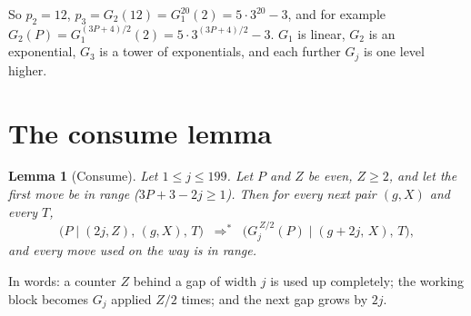 \documentclass[11pt]{article}
\newtheorem{lemma}{Lemma}
\theoremstyle{definition}
\theoremstyle{remark}
\newcommand{\st}[2]{\bigl(#1 \mid #2\bigr)}
\newcommand{\too}{\;\Longrightarrow^{*}\;}
\begin{document}
So $p_2=12$, $p_3=G_2(12)=G_1^{20}(2)=5\cdot 3^{20}-3$, and for example
$G_2(P)=G_1^{(3P+4)/2}(2)=5\cdot 3^{(3P+4)/2}-3$.
$G_1$ is linear, $G_2$ is an exponential, $G_3$ is a tower of exponentials, and
each further $G_j$ is one level higher.

\section{The consume lemma}

\begin{lemma}[Consume]\label{consume}
Let $1\le j\le 199$. Let $P$ and $Z$ be even, $Z\ge 2$, and let the first move be
in range ($3P+3-2j\ge 1$). Then for every next pair $(g,X)$ and every $T$,
\[
\st{P}{(2j,Z),\,(g,X),\,T}\;\too\;\st{G_j^{\,Z/2}(P)}{(g+2j,\,X),\,T},
\]
and every move used on the way is in range.
\end{lemma}

In words: a counter $Z$ behind a gap of width $j$ is used up completely; the
working block becomes $G_j$ applied $Z/2$ times; and the next gap grows by $2j$.
\end{document}
